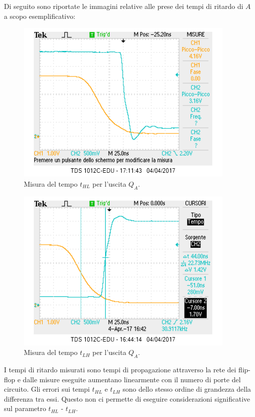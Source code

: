 \documentclass[10pt,a4paper]{article}
\begin{document}
Di seguito sono riportate le immagini relative alle prese dei tempi di ritardo di $A$ a scopo esemplificativo:

\begin{figure}
\centering
\includegraphics[scale=1.0]{tphlQA.png}
\caption{Misura del tempo $t_{HL}$ per l'uscita $Q_A$.\label{qa1}}
\end{figure}

\begin{figure}
\centering
\includegraphics[scale=1.0]{tplhQA.png}
\caption{Misura del tempo $t_{LH}$ per l'uscita $Q_A$.\label{qa2}}
\end{figure}



I tempi di ritardo misurati sono tempi di propagazione attraverso la rete dei flip-flop e dalle misure eseguite aumentano linearmente con il numero di porte del circuito. Gli errori sui tempi $t_{HL}$ e $t_{LH}$ sono dello stesso ordine di grandezza della differenza tra essi. Questo non ci permette di eseguire considerazioni significative sul parametro $t_{HL}$ - $t_{LH}$.\\
\end{document}
